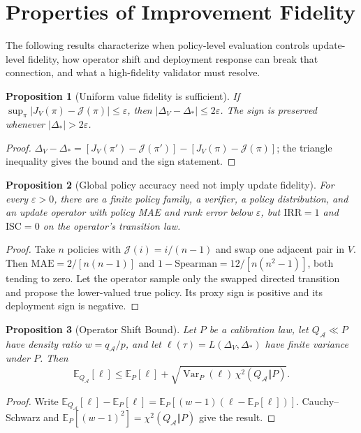 \documentclass{article}
\newcommand{\E}{\mathbb{E}}
\newcommand{\J}{\mathcal{J}}
\newcommand{\dproxy}{\Delta_V}
\newcommand{\dtrue}{\Delta_*}
\newcommand{\pii}{\pi}
\newcommand{\pip}{\pi'}
\newtheorem{proposition}{Proposition}
\begin{document}
\section{Properties of Improvement Fidelity}

The following results characterize when policy-level evaluation controls
update-level fidelity, how operator shift and deployment response can break
that connection, and what a high-fidelity validator must resolve.

\begin{proposition}[Uniform value fidelity is sufficient]
If $\sup_\pi|J_V(\pi)-\J(\pi)|\leq\varepsilon$, then
$|\dproxy-\dtrue|\leq2\varepsilon$. The sign is preserved whenever
$|\dtrue|>2\varepsilon$.
\end{proposition}
\begin{proof}
$\dproxy-\dtrue=[J_V(\pip)-\J(\pip)]-[J_V(\pii)-\J(\pii)]$;
the triangle inequality gives the bound and the sign statement.
\end{proof}

\begin{proposition}[Global policy accuracy need not imply update fidelity]
For every $\varepsilon>0$, there are a finite policy family, a verifier, a
policy distribution, and an update operator with policy MAE and rank error
below $\varepsilon$, but $\mathrm{IRR}=1$ and $\mathrm{ISC}=0$ on the
operator's transition law.
\end{proposition}
\begin{proof}
Take $n$ policies with $\J(i)=i/(n-1)$ and swap one adjacent pair in $V$.
Then $\mathrm{MAE}=2/[n(n-1)]$ and
$1-\mathrm{Spearman}=12/[n(n^2-1)]$, both tending to zero. Let the operator
sample only the swapped directed transition and propose the lower-valued true
policy. Its proxy sign is positive and its deployment sign is negative.
\end{proof}

\begin{proposition}[Operator Shift Bound]
Let $P$ be a calibration law, let $Q_{\mathcal A}\ll P$ have density ratio
$w=q_{\mathcal A}/p$, and let $\ell(\tau)=L(\Delta_V,\Delta_*)$ have finite
variance under $P$. Then
\begin{equation}
 \E_{Q_{\mathcal A}}[\ell]
 \leq
 \E_P[\ell]
 +\sqrt{\operatorname{Var}_P(\ell)\,
 \chi^2(Q_{\mathcal A}\Vert P)}.
\end{equation}
\end{proposition}
\begin{proof}
Write
$\E_{Q_{\mathcal A}}[\ell]-\E_P[\ell]
=\E_P[(w-1)(\ell-\E_P[\ell])]$.
Cauchy--Schwarz and
$\E_P[(w-1)^2]=\chi^2(Q_{\mathcal A}\Vert P)$
give the result.
\end{proof}
\end{document}
